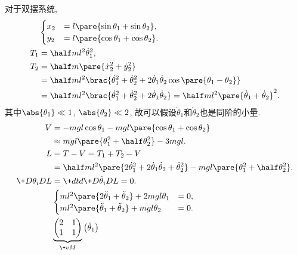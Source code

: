\documentclass[../LectureNotes.tex]{subfiles}
\begin{document}
\begin{sample}
    \begin{ex}
        对于双摆系统,
        \begin{align*}
            &\begin{cases}
            x_2 &= l\pare{\sin\theta_1 + \sin\theta_2}, \\
            y_2 &= l\pare{\cos\theta_1 + \cos\theta_2}.
            \end{cases}\\
            T_1 &= \half ml^2\dot{\theta}_1^2, \\
            T_2 &= \half m\pare{\dot{x}_2^2 + \dot{y}_2^2} \\
            &= \half ml^2 \brac{\dot{\theta}_1^2 + \dot{\theta}_2^2 + 2\dot{\theta}_1\dot{\theta}_2\cos\pare{\theta_1 - \theta_2}} \\
            &= \half m l^2 \brac{\dot{\theta}_1^2 + \dot{\theta}_2^2 + 2\dot{\theta}_1\dot{\theta}_2} = \half ml^2\pare{\dot{\theta}_1 + \dot{\theta}_2}^2.
        \end{align*}
        其中$\abs{\theta_1} \ll 1$, $\abs{\theta_2}\ll 2$, 故可以假设$\dot{\theta}_1$和$\dot{\theta}_2$也是同阶的小量.
        \begin{align*}
            V &= -mgl\cos\theta_1 - mgl \pare{\cos\theta_1 + \cos\theta_2} \\
            &\approx mgl\pare{\theta_1^2 + \half \theta_2^2} - 3mgl. \\
            L &= T-V  = T_1 + T_2 - V \\
            &= \half ml^2\pare{2\dot{\theta}_1^2 + 2\dot{\theta}_1\dot{\theta}_2 + \dot{\theta}_2^2} - mgl\pare{\theta_1^2 + \half \theta_2^2}. \\
            \+D{\theta_i}DL &= \+dtd{} \+D{\dot{\theta}_i}DL = 0. \\
            &\begin{cases}
                ml^2 \pare{2\ddot{\theta}_1 + \ddot{\theta}_2} + 2mgl\theta_1 &= 0, \\
                ml^2 \pare{\ddot{\theta}_1 + \ddot{\theta}_2} + mgl\theta_2 &= 0.
            \end{cases} \\
            & \underbrace{\begin{pmatrix}
                2 & 1 \\
                1 & 1
            \end{pmatrix}}_{\+vM}\begin{pmatrix}
                \ddot{\theta}_1 \\

\end{pmatrix}
\end{align*}
\end{ex}
\end{sample}
\end{document}
